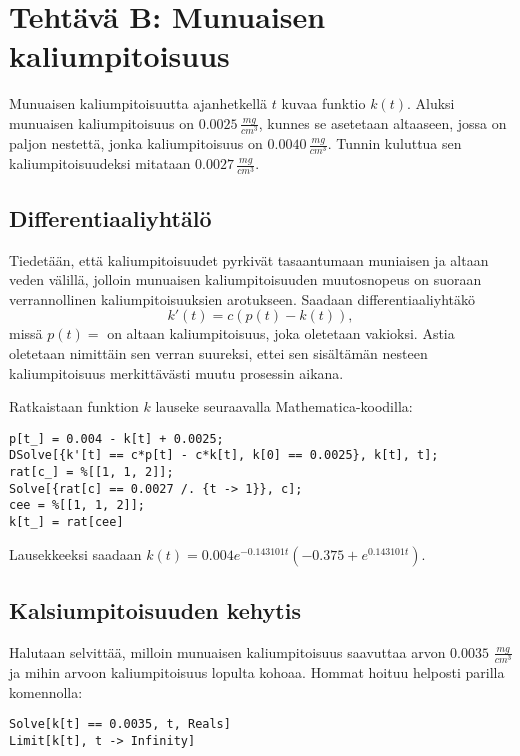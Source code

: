 \documentclass[a4paper,11pt]{article}
\begin{document}
{\section{Tehtävä B: Munuaisen kaliumpitoisuus}

Munuaisen kaliumpitoisuutta ajanhetkellä $t$ kuvaa funktio $k(t)$. Aluksi munuaisen kaliumpitoisuus on $0.0025\,\frac{mg}{cm^3}$, kunnes se asetetaan altaaseen, jossa on paljon nestettä, jonka kaliumpitoisuus on $0.0040\,\frac{mg}{cm^3}$. Tunnin kuluttua sen kaliumpitoisuudeksi mitataan $0.0027\,\frac{mg}{cm^3}$.

\subsection{Differentiaaliyhtälö}

Tiedetään, että kaliumpitoisuudet pyrkivät tasaantumaan muniaisen ja altaan veden välillä, jolloin munuaisen kaliumpitoisuuden muutosnopeus on suoraan verrannollinen kaliumpitoisuuksien arotukseen. Saadaan differentiaaliyhtäkö
\begin{equation}
    k'(t) = c(p(t)-k(t)),
\end{equation}
missä $p(t)=$ on altaan kaliumpitoisuus, joka oletetaan vakioksi. Astia oletetaan nimittäin sen verran suureksi, ettei sen sisältämän nesteen kaliumpitoisuus merkittävästi muutu prosessin aikana.

Ratkaistaan funktion $k$ lauseke seuraavalla Mathematica-koodilla:
\begin{lstlisting}
p[t_] = 0.004 - k[t] + 0.0025;
DSolve[{k'[t] == c*p[t] - c*k[t], k[0] == 0.0025}, k[t], t];
rat[c_] = %[[1, 1, 2]];
Solve[{rat[c] == 0.0027 /. {t -> 1}}, c];
cee = %[[1, 1, 2]];
k[t_] = rat[cee]
\end{lstlisting}

Lausekkeeksi saadaan $k(t) = 0.004 e^{-0.143101t} (-0.375 + e^{0.143101t})$.

\subsection{Kalsiumpitoisuuden kehytis}
\label{paska}

Halutaan selvittää, milloin munuaisen kaliumpitoisuus saavuttaa arvon $0.0035$ $\frac{mg}{cm^3}$ ja mihin arvoon kaliumpitoisuus lopulta kohoaa. Hommat hoituu helposti parilla komennolla:
\begin{lstlisting}
Solve[k[t] == 0.0035, t, Reals]
Limit[k[t], t -> Infinity]
\end{lstlisting}

}
\end{document}
